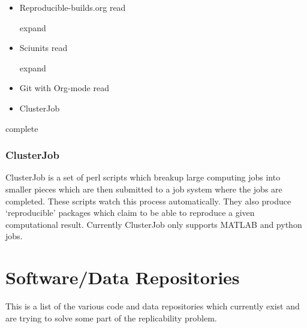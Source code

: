\documentclass[american]{article}
\newcommand{\Read}{
	\gls{read}
}
\newcommand{\complete}{
	\gls{complete}
}
\newcommand{\expand}{
	\gls{expand}
}
\begin{document}
\begin{itemize}
\item Reproducible-builds.org \cite{reproducible-builds} \Read \expand
\item Sciunits \cite{sciunits} \Read \expand
\item Git with Org-mode \cite{Stanisic-git-orgmode-2015} \Read
\item ClusterJob \cite{clusterjob,clusterjob-github}
\end{itemize}

\complete

\subsubsection{ClusterJob}

ClusterJob is a set of perl scripts which breakup large computing jobs into smaller pieces which are then submitted to a job system where the jobs are completed. These scripts watch this process automatically. They also produce `reproducible' packages which claim to be able to reproduce a given computational result. Currently ClusterJob only supports MATLAB and python jobs.

\section{Software/Data Repositories} \label{sec:repositories}

This is a list of the various code and data repositories which currently exist and are trying to solve some part of the replicability problem.
\end{document}

